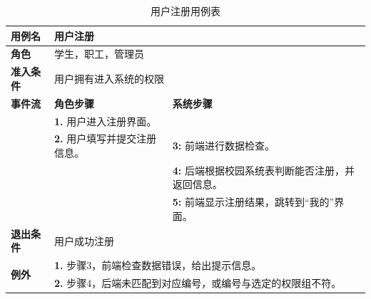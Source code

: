 \begin{table}[H]
  \centering
  \renewcommand\arraystretch{1.1}
  \small
  \caption{用户注册用例表}
  \setlength{\tabcolsep}{4mm}
  \begin{tabular}{|p{2cm}|p{5.75cm}|p{5.75cm}|}
    \hline \textbf{用例名} & \multicolumn{2}{l|}{用户注册} \\
    \hline \textbf{角色} & \multicolumn{2}{l|}{学生，职工，管理员} \\
    \hline \textbf{准入条件} & \multicolumn{2}{l|}{用户拥有进入系统的权限} \\
    \hline \textbf{事件流} & \textbf{角色步骤} & \textbf{系统步骤} \\
    \hline \multirow{3}{*}{~} & \textbf{1.} 用户进入注册界面。  &    \\
    \cline{2-3} & \textbf{2.} 用户填写并提交注册信息。 & \textbf{3:} 前端进行数据检查。 \\
    \cline{2-3} &  & \textbf{4:} 后端根据校园系统表判断能否注册，并返回信息。 \\
    \cline{2-3} &  & \textbf{5:} 前端显示注册结果，跳转到``我的''界面。 \\
    \hline \textbf{退出条件}  & \multicolumn{2}{l|}{用户成功注册} \\
    \hline \multirow{2}{*}{\textbf{例外}} & \multicolumn{2}{l|}{\textbf{1.} 步骤3，前端检查数据错误，给出提示信息。} \\
     & \multicolumn{2}{l|}{\textbf{2.} 步骤4，后端未匹配到对应编号，或编号与选定的权限组不符。} \\
    \hline
  \end{tabular}
\end{table}


